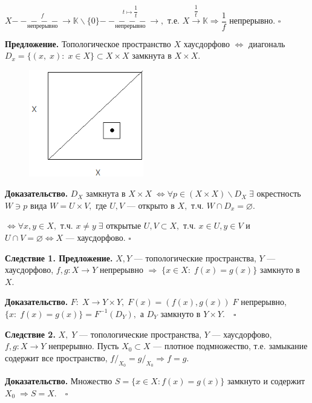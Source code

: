 \documentclass[12pt,a4paper]{article}
\begin{document}
$X \underset{\text{непрерывно}}{\overset{f}{-\!\!\!-\!\!\!-\!\!\!-\!\!\!-\!\!\!\to}} \mathbb{K} \backslash \{0\} \underset{\text{непрерывно}}{\overset{t \mapsto \dfrac{1}{t}}{-\!\!\!-\!\!\!-\!\!\!-\!\!\!-\!\!\!\to}},$ т.е. $X \overset{\dfrac{1}{t}}{\to} \mathbb{K} \Rightarrow \dfrac{1}{f}$ непрерывно. $\square$ 

\textbf{Предложение.} Топологическое пространство $X$ хаусдорфово $\Leftrightarrow$ диагональ $D_{x} = \{(x, \; x): \; x \in X\} \subset X \times X$ замкнута в $X \times X.$ 

\begin{figure}
	\includegraphics[width = 5cm]{lect7_2.png}
\end{figure}

\textbf{Доказательство.} $D_{X}$ замкнута в $X \times X \; \Leftrightarrow \forall p \in (X \times X) \backslash D_{X} \; \exists$ окрестность $W \ni p$ вида $W = U \times V,$ где $U, V$ --- открыто в $X,$ т.ч. $W \cap D_{x} = \varnothing.$ 

$\Leftrightarrow \forall x, y \in X,$ т.ч. $x \neq y \; \exists$ открытые $U, V \subset X,$ т.ч. $x \in U, y \in V$ и $U \cap V = \varnothing \Leftrightarrow X$ --- хаусдорфово. $\square$ 

\textbf{Следствие 1. Предложение.} $X, Y$ --- топологические пространства, $Y$ --- хаусдорфово, $f, g: X \to Y$ непрерывно $\Rightarrow \; \{x \in X: \; f(x) = g(x)\}$ замкнуто в $X.$

\textbf{Доказательство.} $F: \; X \to Y \times Y, \; F(x) = (f(x), g(x))  \; F$ непрерывно, $\{x: \; f(x) = g(x)\} = F^{-1}(D_{Y}),$ а $D_{Y}$ замкнуто в $Y \times Y. \quad \square$

\textbf{Следствие 2.} $X, \; Y$ --- топологические пространства, $Y$ --- хаусдорфово, $f, g: X \to Y$ непрерывно. Пусть $X_{0} \subset X$ --- плотное подмножество, т.е. замыкание содержит все пространство, $f/_{X_{0}} = g/_{X_{0}} \Rightarrow f = g.$ 

\textbf{Доказательство.} Множество $S = \{x \in X: f(x) = g(x)\}$ замкнуто и содержит $X_{0} \; \Rightarrow S = X. \quad \square$
\end{document}
